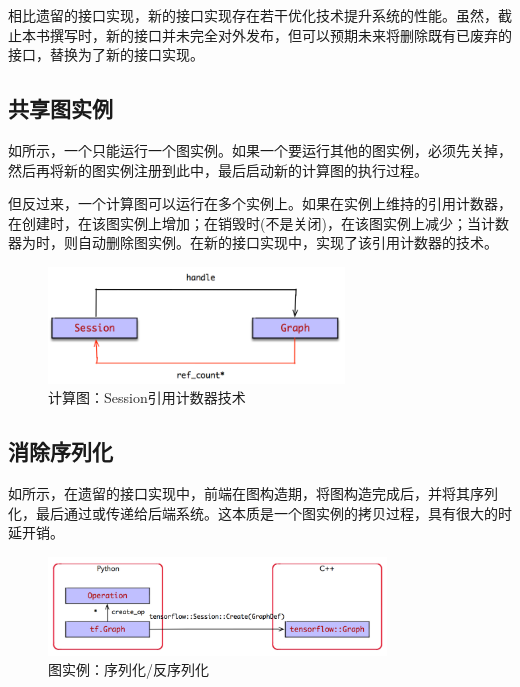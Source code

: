 \begin{content}

相比遗留的接口实现，新的接口实现存在若干优化技术提升系统的性能。虽然，截止本书撰写时，新的接口并未完全对外发布，但可以预期未来将删除既有已废弃的接口，替换为了新的接口实现。

\subsection{共享图实例}

如所示，一个只能运行一个图实例。如果一个要运行其他的图实例，必须先关掉，然后再将新的图实例注册到此中，最后启动新的计算图的执行过程。

但反过来，一个计算图可以运行在多个实例上。如果在实例上维持的引用计数器，在创建时，在该图实例上增加；在销毁时(不是关闭)，在该图实例上减少；当计数器为时，则自动删除图实例。在新的接口实现中，实现了该引用计数器的技术。

\begin{figure}[H]
\centering
\includegraphics[width=0.7\textwidth]{figures/tf-graph-session-relation.png}
\caption{计算图：Session引用计数器技术}
 \label{fig:tf-graph-session-relation}
\end{figure}

\subsection{消除序列化}

如所示，在遗留的接口实现中，前端在图构造期，将图构造完成后，并将其序列化，最后通过或传递给后端系统。这本质是一个图实例的拷贝过程，具有很大的时延开销。

\begin{figure}[H]
\centering
\includegraphics[width=0.8\textwidth]{figures/tf-old-session-interface.png}
\caption{图实例：序列化/反序列化}
 \label{fig:tf-old-session-interface}
\end{figure}


\end{content}
